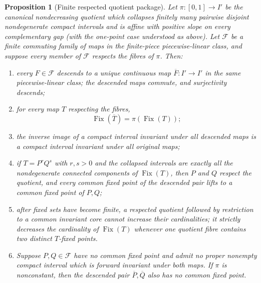 \documentclass[11pt]{article}
\newtheorem{proposition}[theorem]{Proposition}
\theoremstyle{definition}
\theoremstyle{remark}
\newcommand{\I}{[0,1]}
\newcommand{\Fix}{\operatorname{Fix}}
\begin{document}
\begin{proposition}[Finite respected quotient package]
\label{prop:quotient-package}
Let $\pi:\I\to I'$ be the canonical nondecreasing quotient which collapses
finitely many pairwise disjoint nondegenerate compact intervals and is
affine with positive slope on every complementary gap (with the one-point
case understood as above).  Let $\mathscr F$ be a finite commuting
family of maps in the finite-piece piecewise-linear class, and suppose every member of
$\mathscr F$ respects the fibres of $\pi$.  Then:
\begin{enumerate}
\item every $F\in\mathscr F$ descends to a unique continuous map
$\overline F:I'\to I'$ in the same piecewise-linear class; the descended maps commute,
and surjectivity descends;
\item for every map $T$ respecting the fibres,
\begin{equation}\label{eq:fix-quotient-pl}
 \Fix(\overline T)=\pi(\Fix(T));
\end{equation}
\item the inverse image of a compact interval invariant under all descended
maps is a compact interval invariant under all original maps;
\item if $T=P^rQ^s$ with $r,s>0$ and the collapsed intervals are exactly all
the nondegenerate connected components of $\Fix(T)$, then $P$ and $Q$
respect the quotient, and every common fixed point of the descended pair
lifts to a common fixed point of $P,Q$;
\item after fixed sets have become finite, a respected quotient followed by
restriction to a common invariant core cannot increase their cardinalities;
it strictly decreases the cardinality of $\Fix(T)$ whenever one quotient
fibre contains two distinct $T$-fixed points.
\item Suppose $P,Q\in\mathscr F$ have no common fixed point and admit no
proper nonempty compact interval which is forward invariant under both maps.
If $\pi$ is nonconstant, then the descended pair
$\overline P,\overline Q$ also has no common fixed point.
\end{enumerate}
\end{proposition}
\end{document}
